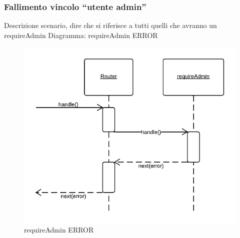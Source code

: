 \subsubsection{Fallimento vincolo ``utente admin''}
Descrizione scenario, dire che si riferisce a tutti quelli che avranno un requireAdmin
Diagramma: requireAdmin ERROR
\begin{figure}[H]
	\begin{center} 
		\includegraphics[scale=0.60]{scenari/requireAdmin ERROR.png} 
		\caption{requireAdmin ERROR}
	\end{center} 
\end{figure}


